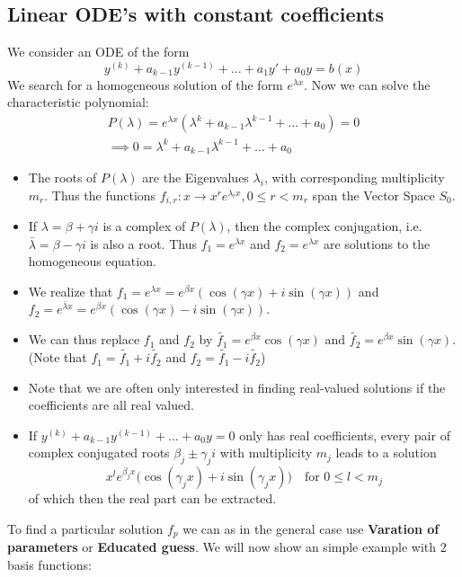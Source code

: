 \documentclass[a4paper,fontsize = 8pt]{scrartcl}
\begin{document}
\subsection{Linear ODE's with constant coefficients}
We consider an ODE of the form
\[y^{(k)} + a_{k-1} y^{(k-1)} + \ldots + a_1 y' + a_0 y = b(x)\]
We search for a homogeneous solution of the form \(e^{\lambda x}\). Now we can solve the characteristic polynomial:
\begin{align*}
  P(\lambda) = e^{\lambda x} \left(\lambda^k + a_{k-1}\lambda^{k-1} + \ldots + a_0\right) = 0 \\ 
  \implies 0 = \lambda^k + a_{k-1}\lambda^{k-1} + \ldots+ a_0
\end{align*}
\begin{itemize}
    \item The roots of \(P(\lambda)\) are the Eigenvalues \(\lambda_i\), with corresponding multiplicity \(m_r\). Thus the functions \(f_{i,r} : x \to x^r e^{\lambda_i x}, 0 \leq r < m_r\) span the Vector Space \(S_0\).
    \item If \(\lambda = \beta + \gamma i\) is a complex of \(P(\lambda)\), then the complex conjugation, i.e. \(\bar{\lambda} = \beta - \gamma i\) is also a root. Thus \(f_1 = e^{\lambda x}\) and \(f_2 = e^{\bar{\lambda} x}\) are solutions to the homogeneous equation.
    \item We realize that \(f_1 = e^{\lambda x} = e^{\beta x} (\cos(\gamma x)+ i \sin(\gamma x))\) and \(f_2 = e^{\bar{\lambda} x}= e^{\beta x} (\cos(\gamma x) - i \sin(\gamma x))\).
    \item We can thus replace $f_1$ and $f_2$ by \(\tilde{f_1} = e^{\beta x} \cos(\gamma x)\) and \(\tilde{f_2} = e^{\beta x} \sin(\gamma x)\). (Note that $f_1 = \tilde{f_1} + i \tilde{f_2}$ and $f_2 = \tilde{f_1} - i \tilde{f_2}$)
    \item Note that we are often only interested in finding real-valued solutions if the coefficients are all real valued.
    \item If \(y^{(k)} + a_{k-1}y^{(k-1)} + \dots + a_0 y = 0\) only has real coefficients, every pair of complex conjugated roots $\beta_j \pm \gamma_j i$ with multiplicity $m_j$ leads to a solution \[x^l e^{\beta_j x} \Big( \cos(\gamma_j x) + i \sin(\gamma_j x) \Big) \quad \text{for }0 \leq l < m_j\]
    of which then the real part can be extracted.
\end{itemize}
To find a particular solution $f_p$ we can as in the general case use \textbf{Varation of parameters} or \textbf{Educated guess}. We will now show an simple example with $2$ basis functions:
\end{document}
